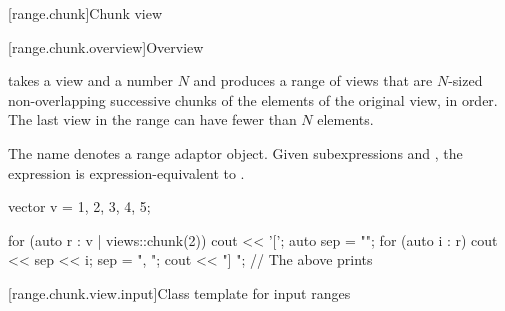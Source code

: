 [range.chunk]{Chunk view}

[range.chunk.overview]{Overview}

\pnum
{} takes a view and a number $N$ and
produces a range of views
that are $N$-sized non-overlapping successive chunks of
the elements of the original view, in order.
The last view in the range can have fewer than $N$ elements.

\pnum
{}%
The name  denotes
a range adaptor object.
Given subexpressions  and ,
the expression  is expression-equivalent to
.

\begin{example}
\begin{codeblock}
vector v = {1, 2, 3, 4, 5};

for (auto r : v | views::chunk(2)) {
  cout << '[';
  auto sep = "";
  for (auto i : r) {
    cout << sep << i;
    sep = ", ";
  }
  cout << "] ";
}
// The above prints \tcode{[1, 2] [3, 4] [5]}
\end{codeblock}
\end{example}

[range.chunk.view.input]{Class template  for input ranges}

